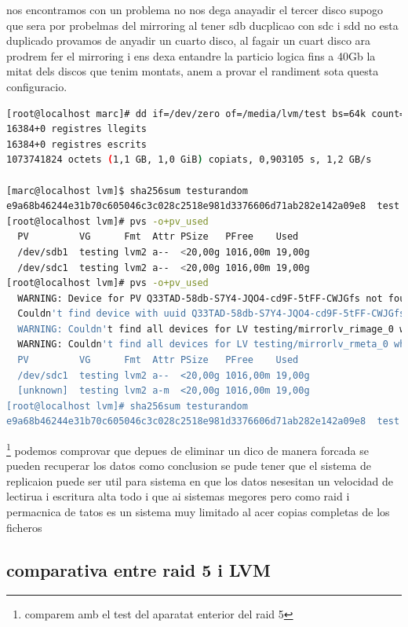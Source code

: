 \documentclass[preprint,11pt]{elsarticle}
\begin{document}
nos encontramos con un problema no nos dega anayadir el tercer disco supogo que sera por probelmas del mirroring al tener sdb ducplicao con sdc i sdd no esta duplicado provamos de anyadir un cuarto disco,  al fagair un cuart disco ara prodrem fer el mirroring i ens dexa entandre la particio logica fins a 40Gb la mitat dels discos que tenim montats, anem a provar el randiment sota questa configuracio. 

\begin{lstlisting}[basicstyle=\tiny, language=bash]
[root@localhost marc]# dd if=/dev/zero of=/media/lvm/test bs=64k count=16k conv=fdatasync
16384+0 registres llegits
16384+0 registres escrits
1073741824 octets (1,1 GB, 1,0 GiB) copiats, 0,903105 s, 1,2 GB/s

[marc@localhost lvm]$ sha256sum testurandom 
e9a68b46244e31b70c605046c3c028c2518e981d3376606d71ab282e142a09e8  test
[root@localhost lvm]# pvs -o+pv_used
  PV         VG      Fmt  Attr PSize   PFree    Used  
  /dev/sdb1  testing lvm2 a--  <20,00g 1016,00m 19,00g
  /dev/sdc1  testing lvm2 a--  <20,00g 1016,00m 19,00g
[root@localhost lvm]# pvs -o+pv_used
  WARNING: Device for PV Q33TAD-58db-S7Y4-JQO4-cd9F-5tFF-CWJGfs not found or rejected by a filter.
  Couldn't find device with uuid Q33TAD-58db-S7Y4-JQO4-cd9F-5tFF-CWJGfs.
  WARNING: Couldn't find all devices for LV testing/mirrorlv_rimage_0 while checking used and assumed devices.
  WARNING: Couldn't find all devices for LV testing/mirrorlv_rmeta_0 while checking used and assumed devices.
  PV         VG      Fmt  Attr PSize   PFree    Used  
  /dev/sdc1  testing lvm2 a--  <20,00g 1016,00m 19,00g
  [unknown]  testing lvm2 a-m  <20,00g 1016,00m 19,00g
[root@localhost lvm]# sha256sum testurandom 
e9a68b46244e31b70c605046c3c028c2518e981d3376606d71ab282e142a09e8  test

\end{lstlisting}\footnote{comparem amb el test del aparatat enterior del raid 5}
podemos comprovar que depues de eliminar un dico de manera forcada se pueden recuperar los datos como conclusion se pude tener que el sistema de replicaion puede ser util para sistema en que los datos nesesitan un velocidad de lectirua i escritura alta todo i que ai sistemas megores pero como raid i permacnica de tatos es un sistema muy limitado al acer copias completas de los ficheros

\subsection{comparativa entre raid 5 i LVM}
\end{document}

